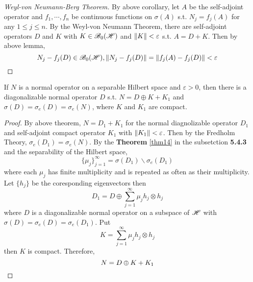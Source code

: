 \documentclass[a4paper,11pt]{report}
\begin{document}
\begin{proof}[Weyl-von Neumann-Berg Theorem]
	By above corollary, let $A$ be the self-adjoint operator and $f_1,\cdots,f_n$ be continuous functions on $\sigma(A)$ s.t. $N_j = f_j(A)$ for any $1 \leqslant j \leqslant n$. By the Weyl-von Neumann Theorem, there are self-adjoint operators $D$ and $K$ with $K \in \mathscr{B}_{0}\mathscr{(H)}$ and $\left\lVert K\right\lVert < \varepsilon$ s.t. $A = D + K$. Then by above lemma,
	\begin{equation*}
		N_j - f_j(D) \in \mathscr{B}_{0}\mathscr{(H)}, \left\lVert N_j - f_j(D)\right\lVert = \left\lVert f_j(A) - f_j(D)\right\lVert < \varepsilon \qedhere
	\end{equation*}
\end{proof}

\begin{cor}
	If $N$ is a normal operator on a separable Hilbert space and $\varepsilon > 0$, then there is a diagonalizable normal operator $D$ s.t. $N = D \oplus K + K_1 $ and $\sigma(D) = \sigma_e(D) = \sigma_e(N)$, where $K$ and $K_1$ are compact.
\end{cor}
\begin{proof}
	By above theorem, $N = D_1 + K_1$ for the normal diagnolizable operator $D_1$ and self-adjoint compact operator $K_1$ with $\left\lVert K_1\right\lVert < \varepsilon$. Then by the Fredholm Theory, $\sigma_e(D_1) = \sigma_e(N)$. By the \textbf{Theorem} \ref{thm14} in the subsetction \textbf{5.4.3} and the separability of the Hilbert space, 
	\begin{equation*}
		\{\mu_j\}_{j=1}^{\infty} = \sigma(D_1) \backslash \sigma_e(D_1)
	\end{equation*}
	where each $\mu_j$ has finite multiplicity and is repeated as often as their multiplicity. Let $\{h_j\}$ be the coresponding eigenvectors then
	\begin{equation*}
		D_1 = D \oplus \sum_{j=1}^{\infty} \mu_j h_j \otimes h_j
	\end{equation*}
	where $D$ is a diagonalizable normal operator on a subspace of $\mathscr{H}$ with $\sigma(D) = \sigma_e(D) = \sigma_e(D_1)$. Put 
	\begin{equation*}
		K = \sum_{j=1}^{\infty} \mu_j h_j \otimes h_j
	\end{equation*}
	then $K$ is compact. Therefore,
	\begin{equation*}
		N = D \oplus K + K_1 \qedhere
	\end{equation*}	
\end{proof}
\end{document}
